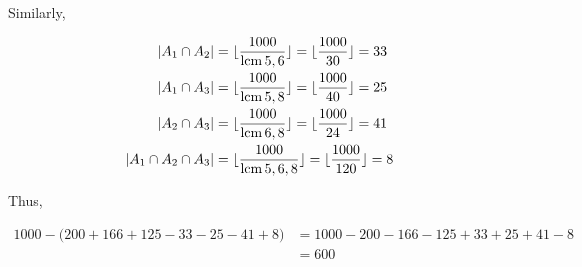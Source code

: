\documentclass{report}
\begin{document}
{    Similarly,

    \begin{align*}
        |A_1 \cap A_2|          & = \lfloor\frac{1000}{\operatorname*{lcm}{5, 6}}\rfloor = \lfloor\frac{1000}{30}\rfloor = 33    \\
        |A_1 \cap A_3|          & = \lfloor\frac{1000}{\operatorname*{lcm}{5, 8}}\rfloor = \lfloor\frac{1000}{40}\rfloor = 25    \\
        |A_2 \cap A_3|          & = \lfloor\frac{1000}{\operatorname*{lcm}{6, 8}}\rfloor = \lfloor\frac{1000}{24}\rfloor = 41    \\
        |A_1 \cap A_2 \cap A_3| & = \lfloor\frac{1000}{\operatorname*{lcm}{5, 6, 8}}\rfloor = \lfloor\frac{1000}{120}\rfloor = 8
    \end{align*}

    Thus,

    \begin{align*}
        1000 - \bigg ( 200 + 166 + 125 - 33 - 25 - 41 + 8 \bigg ) & = 1000 - 200 - 166 - 125 + 33 + 25 + 41 - 8 \\
                                                                  & = 600
    \end{align*}
}
\end{document}
